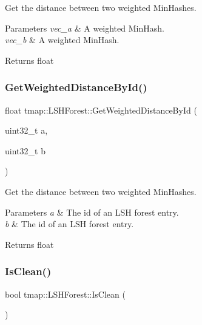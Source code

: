 Get the distance between two weighted Min\+Hashes. 


\begin{DoxyParams}{Parameters}
{\em vec\+\_\+a} & A weighted Min\+Hash. \\
\hline
{\em vec\+\_\+b} & A weighted Min\+Hash. \\
\hline
\end{DoxyParams}
\begin{DoxyReturn}{Returns}
float 
\end{DoxyReturn}
\mbox{\label{classtmap_1_1LSHForest_ab00052289bb6bea152e6024049eebcc5}} 
\subsubsection{\texorpdfstring{Get\+Weighted\+Distance\+By\+Id()}{GetWeightedDistanceById()}}
{\footnotesize\ttfamily float tmap\+::\+L\+S\+H\+Forest\+::\+Get\+Weighted\+Distance\+By\+Id (\begin{DoxyParamCaption}\item[{uint32\+\_\+t}]{a,  }\item[{uint32\+\_\+t}]{b }\end{DoxyParamCaption})}



Get the distance between two weighted Min\+Hashes. 


\begin{DoxyParams}{Parameters}
{\em a} & The id of an L\+SH forest entry. \\
\hline
{\em b} & The id of an L\+SH forest entry. \\
\hline
\end{DoxyParams}
\begin{DoxyReturn}{Returns}
float 
\end{DoxyReturn}
\mbox{\label{classtmap_1_1LSHForest_a7785c1a7f17eddd5e943db4b5d6d7cf2}} 
\subsubsection{\texorpdfstring{Is\+Clean()}{IsClean()}}
{\footnotesize\ttfamily bool tmap\+::\+L\+S\+H\+Forest\+::\+Is\+Clean (\begin{DoxyParamCaption}{ }\end{DoxyParamCaption})}



